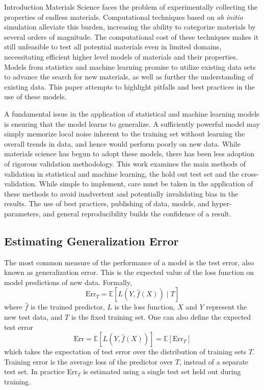 \documentclass[onecolumn,abstract,paper=letter]{scrartcl}
\begin{document}
\begin{section}{Introduction}
Materials Science faces the problem of experimentally collecting the properties of endless materials. 
Computational techniques based on \textit{ab initio} simulation alleviate this burden, increasing the ability to categorize materials by several orders of magnitude. 
The computational cost of these techniques makes it still unfeasible to test all potential materials even in limited domains, necessitating efficient higher level models of materials and their properties. 
Models from statistics and machine learning promise to utilize existing data sets to advance the search for new materials, as well as further the understanding of existing data.
This paper attempts to highlight pitfalls and best practices in the use of these models. 

A fundamental issue in the application of statistical and machine learning models is ensuring that the model learns to generalize.
A sufficiently powerful model may simply memorize local noise inherent to the training set without learning the overall trends in data, and hence would perform poorly on new data. 
While materials science has begun to adopt these models, there has been less adoption of rigorous validation methodology.
This work examines the main methods of validation in statistical and machine learning, the hold out test set and the cross-validation. 
While simple to implement, care must be taken in the application of these methods to avoid inadvertent and potentially invalidating bias in the results. 
The use of best practices, publishing of data, models, and hyper-parameters, and general reproducibility builds the confidence of a result. 

\subsection{Estimating Generalization Error}
The most common measure of the performance of a model is the test error, also known as generalization error.
This is the expected value of the loss function on model predictions of new data. Formally,
\begin{equation}
    \text{Err}_T = \mathbb{E} \left[ L(Y, \hat f(X)) \mid T  \right]
\end{equation}
where $\hat f$ is the trained predictor, $L$ is the loss function, $X$ and $Y$ represent the new test data, and $T$ is the fixed training set.
One can also define the expected test error
\begin{equation}
    \text{Err} = \mathbb{E} \left[ L(Y, \hat f(X)) \right] = \mathbb{E} \left[ \text{Err}_T \right]
\end{equation}
which takes the expectation of test error over the distribution of training sets $T$.
Training error is the average loss of the predictor over $T$, instead of a separate test set. 
In practice Err$_T$ is estimated using a single test set held out during training.


\end{section}
\end{document}
